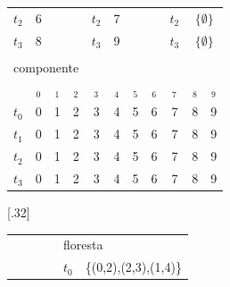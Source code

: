 \documentclass[12pt]{article}
\begin{document}
\begin{figure}
{{\begin{tabular}{ccccccccccc}
				\multicolumn{1}{c|}{$t_2$} & \multicolumn{1}{c|}{6} &  &  & \multicolumn{1}{c|}{$t_2$} & \multicolumn{1}{c|}{7} &  &  & \multicolumn{1}{c|}{$t_2$} & \multicolumn{2}{c|}{$\{\emptyset\}$} \\ \cline{2-2} \cline{6-6} \cline{10-11} 
				\multicolumn{1}{c|}{$t_3$} & \multicolumn{1}{c|}{8} &  &  & \multicolumn{1}{c|}{$t_3$} & \multicolumn{1}{c|}{9} &  &  & \multicolumn{1}{c|}{$t_3$} & \multicolumn{2}{c|}{$\{\emptyset\}$} \\ \cline{2-2} \cline{6-6} \cline{10-11} 
				&  &  &  &  &  &  &  &  &  &  \\
				\multicolumn{11}{l}{componente} \\
				& $ _0$ & $ _1$ & $ _2$ & $ _3$ & $ _4$ & $ _5$ & $ _6$ & $ _7$ & $ _8$ & $ _9$ \\ \cline{2-11} 
				\multicolumn{1}{c|}{$t_0$} & \multicolumn{1}{c|}{0} & \multicolumn{1}{c|}{1} & \multicolumn{1}{c|}{2} & \multicolumn{1}{c|}{3} & \multicolumn{1}{c|}{4} & \multicolumn{1}{c|}{5} & \multicolumn{1}{c|}{6} & \multicolumn{1}{c|}{7} & \multicolumn{1}{c|}{8} & \multicolumn{1}{c|}{9} \\ \cline{2-11} 
				\multicolumn{1}{c|}{$t_1$} & \multicolumn{1}{c|}{0} & \multicolumn{1}{c|}{1} & \multicolumn{1}{c|}{2} & \multicolumn{1}{c|}{3} & \multicolumn{1}{c|}{4} & \multicolumn{1}{c|}{5} & \multicolumn{1}{c|}{6} & \multicolumn{1}{c|}{7} & \multicolumn{1}{c|}{8} & \multicolumn{1}{c|}{9} \\ \cline{2-11} 
				\multicolumn{1}{c|}{$t_2$} & \multicolumn{1}{c|}{0} & \multicolumn{1}{c|}{1} & \multicolumn{1}{c|}{2} & \multicolumn{1}{c|}{3} & \multicolumn{1}{c|}{4} & \multicolumn{1}{c|}{5} & \multicolumn{1}{c|}{6} & \multicolumn{1}{c|}{7} & \multicolumn{1}{c|}{8} & \multicolumn{1}{c|}{9} \\ \cline{2-11} 
				\multicolumn{1}{c|}{$t_3$} & \multicolumn{1}{c|}{0} & \multicolumn{1}{c|}{1} & \multicolumn{1}{c|}{2} & \multicolumn{1}{c|}{3} & \multicolumn{1}{c|}{4} & \multicolumn{1}{c|}{5} & \multicolumn{1}{c|}{6} & \multicolumn{1}{c|}{7} & \multicolumn{1}{c|}{8} & \multicolumn{1}{c|}{9} \\ \cline{2-11} 
				\end{tabular}
		  }}
\subcaptionbox{}[.32\textwidth]
  {		  \resizebox{0.3\textwidth}{!}
		  {
		  		\begin{tabular}{ccccclccccc}
 &  &  &  & \multicolumn{7}{l}{floresta} \\ \cline{6-11} 
 &  &  &  & \multicolumn{1}{c|}{$t_0$} & \multicolumn{6}{l|}{\{(0,2),(2,3),(1,4)\}} \\ \cline{6-11} 

\end{tabular}}}
\end{figure}
\end{document}
